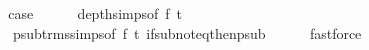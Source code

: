 \begin{isabellebody}
\ \ \isamarkupfalse%
\ \isamarkupfalse%
\ {\isacharquery}{\kern0pt}case\isanewline
\ \ \ \ \isamarkupfalse%
\ depth{\isachardot}{\kern0pt}simps{\isacharparenleft}{\kern0pt}{}{\isacharparenright}{\kern0pt}{\isacharbrackleft}{\kern0pt}of\ f\ t{}{\isacharprime}{\kern0pt}{\isacharbrackright}{\kern0pt}\isanewline
\ \ \ \ \ \ psub{\isacharunderscore}{\kern0pt}trms{\isachardot}{\kern0pt}simps{\isacharparenleft}{\kern0pt}{}{\isacharparenright}{\kern0pt}{\isacharbrackleft}{\kern0pt}of\ f\ t{}{\isacharprime}{\kern0pt}{\isacharbrackright}{\kern0pt}\ if{\isacharunderscore}{\kern0pt}sub{\isacharunderscore}{\kern0pt}not{\isacharunderscore}{\kern0pt}eq{\isacharunderscore}{\kern0pt}then{\isacharunderscore}{\kern0pt}psub\isanewline
\ \ \ \ \isamarkupfalse%
\ fastforce\isanewline
{}\isamarkupfalse%
%
\endisatagproof
{\isafoldproof}%
%
\isadelimproof
\isanewline
%
\endisadelimproof
%
\isadelimtheory
\isanewline
%
\endisadelimtheory
%
\isatagtheory
{}\isamarkupfalse%
%
\endisatagtheory
{\isafoldtheory}%
%
\isadelimtheory
%
\endisadelimtheory
%
\end{isabellebody}%
\endinput
